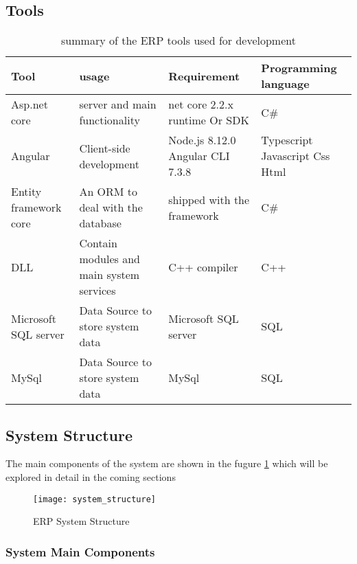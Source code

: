 \subsection{Tools}

\begin{table}[h!]
\centering
\begin{tabular}{ |p{3cm}|p{3cm}|p{3cm}|p{3cm}|  }
    \hline
    \textbf{Tool} & \textbf{usage} & \textbf{Requirement} & \textbf{Programming language}\\
    \hline
    Asp.net core  & server and main functionality  & net core 2.2.x
    runtime
    Or SDK  & C\#\\
    \hline
    Angular  & Client-side development  & Node.js 8.12.0
    Angular CLI
    7.3.8  & Typescript
    Javascript
    Css
    Html\\
    \hline
    Entity framework
core  & An ORM to deal with the
database  & shipped with the
framework  & C\#\\
    \hline
    DLL & Contain modules and main
    system services  & C++ compiler  & C++\\
    \hline
    Microsoft SQL
server  & Data Source to store
system data  & Microsoft SQL
server  & SQL\\
    \hline
    MySql  & Data Source to store
    system data  & MySql  & SQL\\
    \hline
\end{tabular}
\caption{summary of the ERP tools used for development}
\label{table:1}
\end{table}


\subsection{System Structure}

The main components of the system are shown in the fugure \ref{fig:system_structure} which will be explored in
detail in the coming sections

\begin{figure}
    \texttt{[image: system\_structure]}
    \centering
    \caption{ERP System Structure}
    \label{fig:system_structure}
\end{figure}


\subsubsection{System Main Components}

